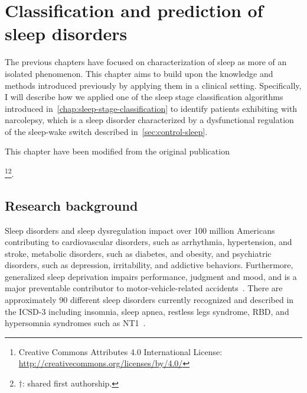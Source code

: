 \acresetall
\chapter{Classification and prediction of sleep disorders}\label{chap:classification-sleep-disorders}
\vspace{6cm}

The previous chapters have focused on characterization of sleep as more of an isolated phenomenon.
This chapter aims to build upon the knowledge and methods introduced previously by applying them in a clinical setting.
Specifically, I will describe how we applied one of the sleep stage classification algorithms introduced in~\cref{chap:sleep-stage-classification} to identify patients exhibiting with narcolepsy, which is a sleep disorder characterized by a dysfunctional regulation of the sleep-wake switch described in~\cref{sec:control-sleep}.

This chapter have been modified from the original publication  
\begin{displayquote}
    \footnote{Creative Commons Attributes 4.0 International License: \url{http://creativecommons.org/licenses/by/4.0/}}\footnote{\(\dagger\): shared first authorship.}.
\end{displayquote}

\section{Research background}

Sleep disorders and sleep dysregulation impact over \num{100} million Americans contributing to cardiovascular disorders, such as arrhythmia, hypertension, and stroke, metabolic disorders, such as diabetes, and obesity, and psychiatric disorders, such as depression, irritability, and addictive behaviors. 
Furthermore, generalized sleep deprivation impairs performance, judgment and mood, and is a major preventable contributor to motor-vehicle-related accidents~\cite{Krieger2007}.
There are approximately \num{90} different sleep disorders currently recognized and described in the \ac{ICSD-3} including insomnia, sleep apnea, restless legs syndrome, \ac{RBD}, and hypersomnia syndromes such as \ac{NT1}~\cite{AmericanAcademyofSleepMedicine2014}.

